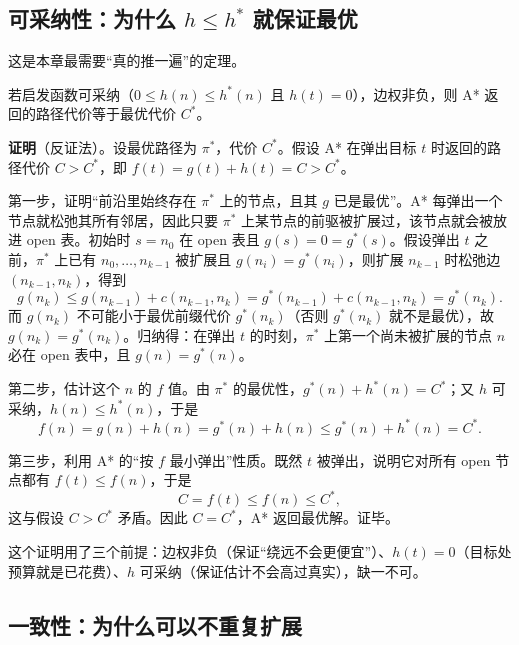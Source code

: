 \subsection{可采纳性：为什么 $h\le h^*$ 就保证最优}

这是本章最需要“真的推一遍”的定理。

\begin{theorem}[A* 的最优性]
若启发函数可采纳（$0\le h(n)\le h^*(n)$ 且 $h(t)=0$），边权非负，则 A* 返回的路径代价等于最优代价 $C^*$。
\end{theorem}

\textbf{证明}（反证法）。设最优路径为 $\pi^*$，代价 $C^*$。假设 A* 在弹出目标 $t$ 时返回的路径代价 $C>C^*$，即 $f(t)=g(t)+h(t)=C>C^*$。

第一步，证明“前沿里始终存在 $\pi^*$ 上的节点，且其 $g$ 已是最优”。A* 每弹出一个节点就松弛其所有邻居，因此只要 $\pi^*$ 上某节点的前驱被扩展过，该节点就会被放进 open 表。初始时 $s=n_0$ 在 open 表且 $g(s)=0=g^*(s)$。假设弹出 $t$ 之前，$\pi^*$ 上已有 $n_0,\dots,n_{k-1}$ 被扩展且 $g(n_i)=g^*(n_i)$，则扩展 $n_{k-1}$ 时松弛边 $(n_{k-1},n_k)$，得到
\begin{equation}
  g(n_k)\le g(n_{k-1})+c(n_{k-1},n_k)=g^*(n_{k-1})+c(n_{k-1},n_k)=g^*(n_k).
\end{equation}
而 $g(n_k)$ 不可能小于最优前缀代价 $g^*(n_k)$（否则 $g^*(n_k)$ 就不是最优），故 $g(n_k)=g^*(n_k)$。归纳得：在弹出 $t$ 的时刻，$\pi^*$ 上第一个尚未被扩展的节点 $n$ 必在 open 表中，且 $g(n)=g^*(n)$。

第二步，估计这个 $n$ 的 $f$ 值。由 $\pi^*$ 的最优性，$g^*(n)+h^*(n)=C^*$；又 $h$ 可采纳，$h(n)\le h^*(n)$，于是
\begin{equation}
  f(n)=g(n)+h(n)=g^*(n)+h(n)\le g^*(n)+h^*(n)=C^*.
\end{equation}

第三步，利用 A* 的“按 $f$ 最小弹出”性质。既然 $t$ 被弹出，说明它对所有 open 节点都有 $f(t)\le f(n)$，于是
\begin{equation}
  C=f(t)\le f(n)\le C^*,
\end{equation}
这与假设 $C>C^*$ 矛盾。因此 $C=C^*$，A* 返回最优解。证毕。

这个证明用了三个前提：边权非负（保证“绕远不会更便宜”）、$h(t)=0$（目标处预算就是已花费）、$h$ 可采纳（保证估计不会高过真实），缺一不可。

\subsection{一致性：为什么可以不重复扩展}

